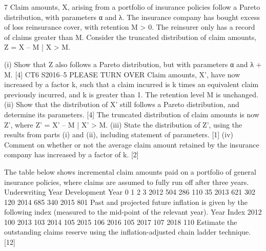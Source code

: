 7 Claim amounts, X, arising from a portfolio of insurance policies follow a Pareto
distribution, with parameters α and λ. The insurance company has bought excess of
loss reinsurance cover, with retention M > 0.
The reinsurer only has a record of claims greater than M. Consider the truncated distribution of claim amounts, Z = X – M | X > M.
\begin{enumerate}
(i) Show that Z also follows a Pareto distribution, but with parameters α and
λ + M. [4]
CT6 S2016–5 PLEASE TURN OVER
Claim amounts, X’, have now increased by a factor k, such that a claim incurred is k
times an equivalent claim previously incurred, and k is greater than 1. The retention level M is unchanged.
(ii) Show that the distribution of X’ still follows a Pareto distribution, and
determine its parameters. [4]
The truncated distribution of claim amounts is now Z’, where Z’ = X’ – M | X’ > M.
(iii) State the distribution of Z’, using the results from parts (i) and (ii), including
statement of parameters. [1]
(iv) Comment on whether or not the average claim amount retained by the
insurance company has increased by a factor of k. [2]
\end{enumerate}
 The table below shows incremental claim amounts paid on a portfolio of general
insurance policies, where claims are assumed to fully run off after three years.
Underwriting
Year
Development Year
0 1 2 3
2012 504 286 110 35
2013 621 302 120
2014 685 340
2015 801
Past and projected future inflation is given by the following index (measured to the
                                                                     mid-point of the relevant year).
Year
Index
2012 100
2013 103
2014 105
2015 106
2016 105
2017 107
2018 110
Estimate the outstanding claims reserve using the inflation-adjusted chain ladder
technique. [12]

